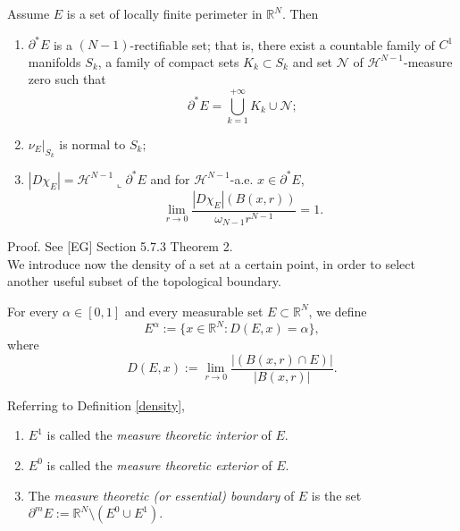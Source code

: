\begin{theorem} \label{structhm1} Assume $E$ is a set of locally finite perimeter in $\mathbb{R}^{N}$. Then
\begin{enumerate}
	\item $\partial^{*}E$ is a $(N-1)$-rectifiable set; that is, there exist a countable family of $C^{1}$ manifolds $S_{k}$, a family of compact sets $K_{k} \subset S_{k}$ and set $\mathcal{N}$ of $\mathcal{H}^{N-1}$-measure zero such that
\[ \partial^{*}E = \bigcup_{k=1}^{+\infty} K_{k} \cup \mathcal{N}; \]
	\item $\nu_{E} |_{S_{k}}$ is normal to $S_{k};$
	\item $|D\chi_{E}| = \mathcal{H}^{N-1} \llcorner \partial^{*}E$ and for $\mathcal{H}^{N - 1}$-a.e. $x \in \partial^{*}E$,
\[ \lim_{r \to 0 } \frac{|D\chi_{E}|(B(x,r))}{\omega_{N-1}r^{N - 1}} = 1. \]
\end{enumerate}
\end{theorem}
Proof. See [EG] Section 5.7.3 Theorem 2.
\\

We introduce now the density of a set at a certain point, in order to select another useful subset of the topological boundary.

\begin{definition} \label{density} For every $\alpha \in [0, 1]$ and every measurable set $E \subset \mathbb{R}^{N}$, we define
\[ E^{\alpha} := \{ x \in \mathbb{R}^{N} : D(E, x) = \alpha \}, \]
where
\[ D(E, x) := \lim_{r \to 0} \frac{|(B(x,r) \cap E)|}{|B(x,r)|}.  \]
\end{definition}

\begin{definition} \label{measuretheorintext} Referring to Definition \ref{density},
\begin{enumerate}
	\item $E^{1}$ is called the {\em measure theoretic interior} of $E$.
	\item $E^{0}$ is called the {\em measure theoretic exterior} of $E$.
	\item The {\em measure theoretic (or essential) boundary} of $E$ is the set $\partial^{m}E := \mathbb{R}^{N} \setminus (E^{0} \cup E^{1})$.
\end{enumerate}
\end{definition}

